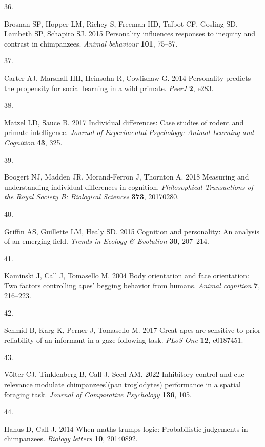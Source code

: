 \documentclass[
  man,floatsintext]{apa6}
\newlength{\cslhangindent}
\newlength{\csllabelwidth}
\newenvironment{CSLReferences}[2] %
 {\begin{list}{}{%
  \setlength{\itemindent}{0pt}
  \setlength{\leftmargin}{0pt}
  \setlength{\parsep}{0pt}
  \ifodd #1
   \setlength{\leftmargin}{\cslhangindent}
   \setlength{\itemindent}{-1\cslhangindent}
  \fi
  \setlength{\itemsep}{#2\baselineskip}}}
 {\end{list}}
\newcommand{\CSLLeftMargin}[1]{\parbox[t]{\csllabelwidth}{\strut#1\strut}}
\newcommand{\CSLRightInline}[1]{\parbox[t]{\linewidth - \csllabelwidth}{\strut#1\strut}}
\begin{document}
\begin{CSLReferences}{0}{1}
\CSLLeftMargin{36. }%
\CSLRightInline{Brosnan SF, Hopper LM, Richey S, Freeman HD, Talbot CF, Gosling SD, Lambeth SP, Schapiro SJ. 2015 Personality influences responses to inequity and contrast in chimpanzees. \emph{Animal behaviour} \textbf{101}, 75--87.}

\CSLLeftMargin{37. }%
\CSLRightInline{Carter AJ, Marshall HH, Heinsohn R, Cowlishaw G. 2014 Personality predicts the propensity for social learning in a wild primate. \emph{PeerJ} \textbf{2}, e283.}

\CSLLeftMargin{38. }%
\CSLRightInline{Matzel LD, Sauce B. 2017 Individual differences: Case studies of rodent and primate intelligence. \emph{Journal of Experimental Psychology: Animal Learning and Cognition} \textbf{43}, 325.}

\CSLLeftMargin{39. }%
\CSLRightInline{Boogert NJ, Madden JR, Morand-Ferron J, Thornton A. 2018 Measuring and understanding individual differences in cognition. \emph{Philosophical Transactions of the Royal Society B: Biological Sciences} \textbf{373}, 20170280.}

\CSLLeftMargin{40. }%
\CSLRightInline{Griffin AS, Guillette LM, Healy SD. 2015 Cognition and personality: An analysis of an emerging field. \emph{Trends in Ecology \& Evolution} \textbf{30}, 207--214.}

\CSLLeftMargin{41. }%
\CSLRightInline{Kaminski J, Call J, Tomasello M. 2004 Body orientation and face orientation: Two factors controlling apes' begging behavior from humans. \emph{Animal cognition} \textbf{7}, 216--223.}

\CSLLeftMargin{42. }%
\CSLRightInline{Schmid B, Karg K, Perner J, Tomasello M. 2017 Great apes are sensitive to prior reliability of an informant in a gaze following task. \emph{PLoS One} \textbf{12}, e0187451.}

\CSLLeftMargin{43. }%
\CSLRightInline{Völter CJ, Tinklenberg B, Call J, Seed AM. 2022 Inhibitory control and cue relevance modulate chimpanzees'(pan troglodytes) performance in a spatial foraging task. \emph{Journal of Comparative Psychology} \textbf{136}, 105.}

\CSLLeftMargin{44. }%
\CSLRightInline{Hanus D, Call J. 2014 When maths trumps logic: Probabilistic judgements in chimpanzees. \emph{Biology letters} \textbf{10}, 20140892.}


\end{CSLReferences}
\end{document}
